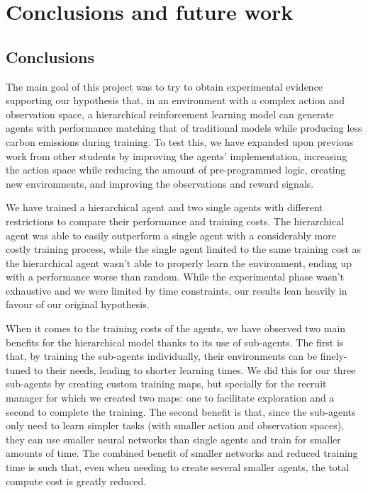 \chapter{Conclusions and future work}
\label{chapter:conclusions}

\section{Conclusions}

The main goal of this project was to try to obtain experimental evidence supporting our hypothesis that, in an environment with a complex action and observation space, a hierarchical reinforcement learning model can generate agents with performance matching that of traditional models while producing less carbon emissions during training. To test this, we have expanded upon previous work from other students by improving the agents' implementation, increasing the action space while reducing the amount of pre-programmed logic, creating new environments, and improving the observations and reward signals.

We have trained a hierarchical agent and two single agents with different restrictions to compare their performance and training costs. The hierarchical agent was able to easily outperform a single agent with a considerably more costly training process, while the single agent limited to the same training cost as the hierarchical agent wasn't able to properly learn the environment, ending up with a performance worse than random. While the experimental phase wasn't exhaustive and we were limited by time constraints, our results lean heavily in favour of our original hypothesis.

When it comes to the training costs of the agents, we have observed two main benefits for the hierarchical model thanks to its use of sub-agents. The first is that, by training the sub-agents individually, their environments can be finely-tuned to their needs, leading to shorter learning times. We did this for our three sub-agents by creating custom training maps, but specially for the recruit manager for which we created two maps: one to facilitate exploration and a second to complete the training. The second benefit is that, since the sub-agents only need to learn simpler tasks (with smaller action and observation spaces), they can use smaller neural networks than single agents and train for smaller amounts of time. The combined benefit of smaller networks and reduced training time is such that, even when needing to create several smaller agents, the total compute cost is greatly reduced.

